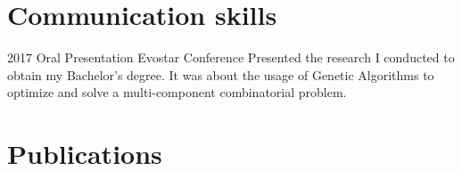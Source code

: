\documentclass[a4paper]{cv-friggeri-x}
\begin{document}

\section{Communication skills}

\begin{entrylist}


\entry
{2017}
{Oral Presentation}
{Evostar Conference}
{Presented the research I conducted to obtain my Bachelor's degree. It was about the usage of Genetic Algorithms to optimize and solve a multi-component combinatorial problem.}


\end{entrylist}





\section{Publications}



\end{document}
